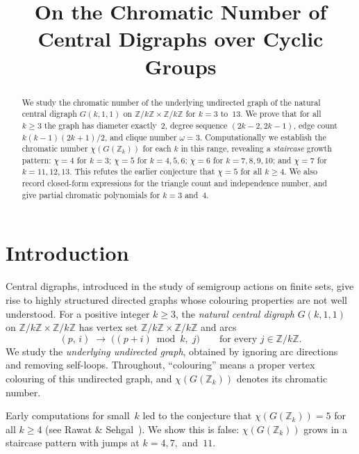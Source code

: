 \documentclass[12pt]{article}
\title{On the Chromatic Number of Central Digraphs over Cyclic Groups}
\author{
}
\date{}
\theoremstyle{definition}
\theoremstyle{remark}
\newcommand{\Z}{\mathbb{Z}}
\newcommand{\Zk}{\Z/k\Z}
\newcommand{\GZk}{G(\Z_k)}
\begin{document}
\maketitle

\begin{abstract}
We study the chromatic number of the underlying undirected graph of the
natural central digraph $G(k,1,1)$ on $\Zk \times \Zk$ for $k = 3$ to~$13$.
We prove that for all $k \ge 3$ the graph has diameter exactly~$2$,
degree sequence $(2k{-}2, 2k{-}1)$, edge count $k(k{-}1)(2k{+}1)/2$,
and clique number $\omega = 3$.  Computationally we establish the chromatic
number $\chi(\GZk)$ for each $k$ in this range, revealing a
\emph{staircase} growth pattern: $\chi = 4$ for $k = 3$; $\chi = 5$ for
$k = 4,5,6$; $\chi = 6$ for $k = 7,8,9,10$; and $\chi = 7$ for
$k = 11,12,13$.  This refutes the earlier conjecture that $\chi = 5$
for all $k \ge 4$.  We also record closed-form expressions for the triangle
count and independence number, and give partial chromatic polynomials for
$k = 3$ and~$4$.
\end{abstract}


\section{Introduction}
\label{sec:intro}

Central digraphs, introduced in the study of semigroup actions on finite
sets, give rise to highly structured directed graphs whose colouring
properties are not well understood.  For a positive integer $k \ge 3$, the
\emph{natural central digraph} $G(k,1,1)$ on $\Zk \times \Zk$ has vertex
set $\Zk \times \Zk$ and arcs
\[
  (p,\, i) \;\longrightarrow\; \bigl((p+i) \bmod k,\; j\bigr)
  \qquad \text{for every } j \in \Zk.
\]
We study the \emph{underlying undirected graph}, obtained by ignoring arc
directions and removing self-loops.  Throughout, ``colouring'' means a
proper vertex colouring of this undirected graph, and $\chi(\GZk)$ denotes
its chromatic number.

Early computations for small~$k$ led to the conjecture that $\chi(\GZk) = 5$
for all $k \ge 4$ (see Rawat \& Sehgal~\cite{rawat2026}).  We show this is
false: $\chi(\GZk)$ grows in a staircase pattern with jumps at $k = 4, 7,$
and~$11$.
\end{document}
